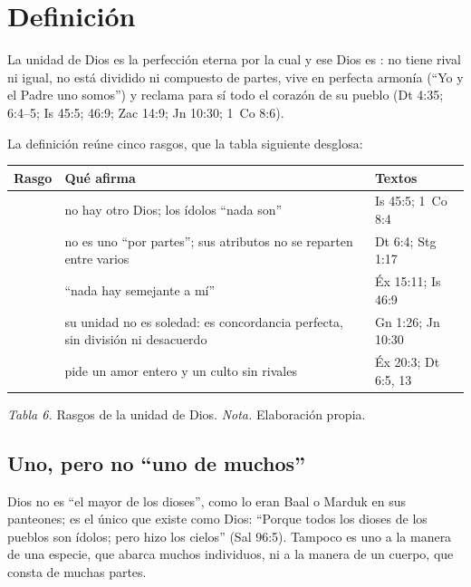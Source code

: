 \section{Definición}

\begin{tcolorbox}[colback=papiro,colframe=azul,boxrule=1pt,arc=3pt]
La unidad de Dios es la perfección eterna por la cual  y ese Dios es : no tiene rival ni igual, no está dividido ni compuesto de partes, vive en perfecta armonía (``Yo y el Padre uno somos'') y reclama para sí todo el corazón de su pueblo (Dt 4:35; 6:4--5; Is 45:5; 46:9; Zac 14:9; Jn 10:30; 1~Co 8:6).
\end{tcolorbox}

La definición reúne cinco rasgos, que la tabla siguiente desglosa:

\begin{center}\small\renewcommand{\arraystretch}{1.3}
\begin{tabular}{@{}L{2.6cm}L{8.0cm}L{3.8cm}@{}}
\toprule
\textbf{Rasgo} & \textbf{Qué afirma} & \textbf{Textos} \\ \midrule
{} & no hay otro Dios; los ídolos ``nada son'' & Is 45:5; 1~Co 8:4 \\
 & no es uno ``por partes''; sus atributos no se reparten entre varios & Dt 6:4; Stg 1:17 \\
 & ``nada hay semejante a mí'' & Éx 15:11; Is 46:9 \\
 & su unidad no es soledad: es concordancia perfecta, sin división ni desacuerdo & Gn 1:26; Jn 10:30 \\
 & pide un amor entero y un culto sin rivales & Éx 20:3; Dt 6:5, 13 \\
\bottomrule
\end{tabular}\par
{\footnotesize\color{gris}\textit{Tabla 6.} Rasgos de la unidad de Dios. \textit{Nota.} Elaboración propia.}
\end{center}

\subsection{Uno, pero no “uno de muchos”}
Dios no es ``el mayor de los dioses'', como lo eran Baal o Marduk en sus panteones; es el único que existe como Dios: ``Porque todos los dioses de los pueblos son ídolos; pero \SENOR{} hizo los cielos'' (Sal 96:5). Tampoco es uno a la manera de una especie, que abarca muchos individuos, ni a la manera de un cuerpo, que consta de muchas partes.

